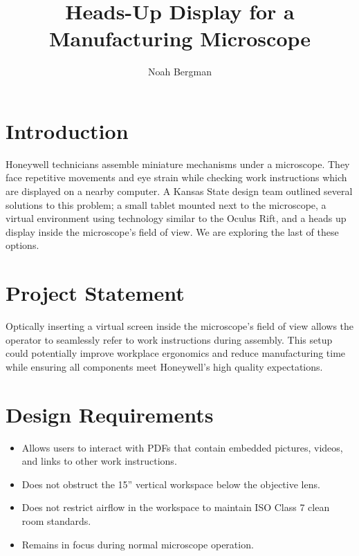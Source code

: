 \documentclass[12pt,a4paper]{article}
\author{Noah Bergman}
\title{Heads-Up Display for a Manufacturing Microscope}
\begin{document}
\maketitle

\pagebreak



\tableofcontents

\listoffigures

\listoftables

\pagebreak
\section{Introduction}
Honeywell technicians assemble miniature mechanisms under a microscope. They face repetitive movements and eye strain while checking work instructions which are displayed on a nearby computer. A Kansas State design team outlined several solutions to this problem; a small tablet mounted next to the microscope, a virtual environment using technology similar to the Oculus Rift, and a heads up display inside the microscope’s field of view. We are exploring the last of these options. 





\section{Project Statement}
Optically inserting a virtual screen inside the microscope’s field of view allows the operator to seamlessly refer to work instructions during assembly. This setup could potentially improve workplace ergonomics and reduce manufacturing time while ensuring all components meet Honeywell’s high quality expectations. 

\section{Design Requirements}

\begin{itemize}
	\item Allows users to interact with PDFs that contain embedded pictures, videos, and links to other work instructions.
	\item Does not obstruct the 15” vertical workspace below the objective lens.
	\item Does not restrict airflow in the workspace to maintain ISO Class 7 clean room standards.
	\item Remains in focus during normal microscope operation.
\end{itemize}
\end{document}

